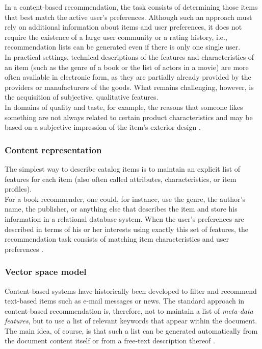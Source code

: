 In a content-based recommendation, the task consists of
determining those items that best match the active user's preferences.
Although such an approach must rely on additional information about
items and user preferences, it does not require the existence of a
large user community or a rating history, i.e., recommendation lists
can be generated even if there is only one single user. \\In practical
settings, technical descriptions of the features and characteristics
of an item (such as the genre of a book or the list of actors in a
movie) are more often available in electronic form, as they are
partially already provided by the providers or manufacturers of the
goods. What remains challenging, however, is the acquisition of
subjective, qualitative features. \\ In domains of quality and taste,
for example, the reasons that someone likes something are not always
related to certain product characteristics and may be based on a
subjective impression of the item’s exterior design
 \cite{jannach2010recommender}.

\subsubsection{Content representation} 

The simplest way to describe catalog items is to maintain an explicit
list of features for each item (also often called attributes,
characteristics, or item profiles). \\ For a book recommender, one could,
for instance, use the genre, the author's name, the publisher, or
anything else that describes the item and store his information in a
relational database system. When the user's preferences are described
in terms of his or her interests using exactly this set of features,
the recommendation task consists of matching item characteristics and
user preferences  \cite{jannach2010recommender}.

\subsubsection{Vector space model}  

Content-based systems have historically been developed to filter and
recommend text-based items such as e-mail messages or news.  The
standard approach in content-based recommendation is, therefore,  not
to maintain a list of \textit{meta-data features}, but to use a list
of relevant keywords that appear within the document. \\The main idea,
of course, is that such a list can be generated automatically from the
document content itself or from a free-text description thereof
\cite{jannach2010recommender}.

